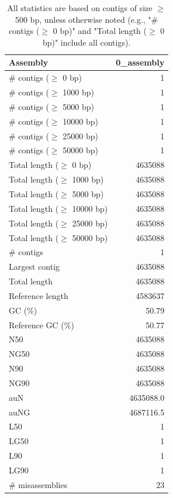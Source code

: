 \documentclass[12pt,a4paper]{article}
\begin{document}
\begin{table}[ht]
\begin{center}
\caption{All statistics are based on contigs of size $\geq$ 500 bp, unless otherwise noted (e.g., "\# contigs ($\geq$ 0 bp)" and "Total length ($\geq$ 0 bp)" include all contigs).}
\begin{tabular}{|l*{1}{|r}|}
\hline
Assembly & 0\_assembly \\ \hline
\# contigs ($\geq$ 0 bp) & 1 \\ \hline
\# contigs ($\geq$ 1000 bp) & 1 \\ \hline
\# contigs ($\geq$ 5000 bp) & 1 \\ \hline
\# contigs ($\geq$ 10000 bp) & 1 \\ \hline
\# contigs ($\geq$ 25000 bp) & 1 \\ \hline
\# contigs ($\geq$ 50000 bp) & 1 \\ \hline
Total length ($\geq$ 0 bp) & 4635088 \\ \hline
Total length ($\geq$ 1000 bp) & 4635088 \\ \hline
Total length ($\geq$ 5000 bp) & 4635088 \\ \hline
Total length ($\geq$ 10000 bp) & 4635088 \\ \hline
Total length ($\geq$ 25000 bp) & 4635088 \\ \hline
Total length ($\geq$ 50000 bp) & 4635088 \\ \hline
\# contigs & 1 \\ \hline
Largest contig & 4635088 \\ \hline
Total length & 4635088 \\ \hline
Reference length & 4583637 \\ \hline
GC (\%) & 50.79 \\ \hline
Reference GC (\%) & 50.77 \\ \hline
N50 & 4635088 \\ \hline
NG50 & 4635088 \\ \hline
N90 & 4635088 \\ \hline
NG90 & 4635088 \\ \hline
auN & 4635088.0 \\ \hline
auNG & 4687116.5 \\ \hline
L50 & 1 \\ \hline
LG50 & 1 \\ \hline
L90 & 1 \\ \hline
LG90 & 1 \\ \hline
\# misassemblies & 23 \\ \hline

\end{tabular}
\end{center}
\end{table}
\end{document}
